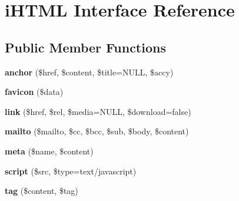 \hypertarget{interface_w_a_f_f_l_e_1_1_framework_1_1_interfaces_1_1i_h_t_m_l}{}\section{i\+H\+T\+ML Interface Reference}
\label{interface_w_a_f_f_l_e_1_1_framework_1_1_interfaces_1_1i_h_t_m_l}
\subsection*{Public Member Functions}
\begin{DoxyCompactItemize}
\item 
\mbox{\label{interface_w_a_f_f_l_e_1_1_framework_1_1_interfaces_1_1i_h_t_m_l_aef42f93e488e349161740f935a45b12e}} 
{\bfseries anchor} (\$href, \$content, \$title=N\+U\+LL, \$accy)
\item 
\mbox{\label{interface_w_a_f_f_l_e_1_1_framework_1_1_interfaces_1_1i_h_t_m_l_a9765bd1f47414643afb176d0f249d428}} 
{\bfseries favicon} (\$data)
\item 
\mbox{\label{interface_w_a_f_f_l_e_1_1_framework_1_1_interfaces_1_1i_h_t_m_l_a7596de1be94a6dc237fa4d435193da8b}} 
{\bfseries link} (\$href, \$rel, \$media=N\+U\+LL, \$download=false)
\item 
\mbox{\label{interface_w_a_f_f_l_e_1_1_framework_1_1_interfaces_1_1i_h_t_m_l_a77b7fda51b7845d6a6c738efc5d248ff}} 
{\bfseries mailto} (\$mailto, \$cc, \$bcc, \$sub, \$body, \$content)
\item 
\mbox{\label{interface_w_a_f_f_l_e_1_1_framework_1_1_interfaces_1_1i_h_t_m_l_af2959b14380c3635ed932a5d1b877bd8}} 
{\bfseries meta} (\$name, \$content)
\item 
\mbox{\label{interface_w_a_f_f_l_e_1_1_framework_1_1_interfaces_1_1i_h_t_m_l_aa59c53e797a510a8bdf06677ab9795b8}} 
{\bfseries script} (\$src, \$type=\textquotesingle{}text/javascript\textquotesingle{})
\item 
\mbox{\label{interface_w_a_f_f_l_e_1_1_framework_1_1_interfaces_1_1i_h_t_m_l_a61aeb234b0eb5d6895f91ba5b533bfce}} 
{\bfseries tag} (\$content, \$tag)
\end{DoxyCompactItemize}


